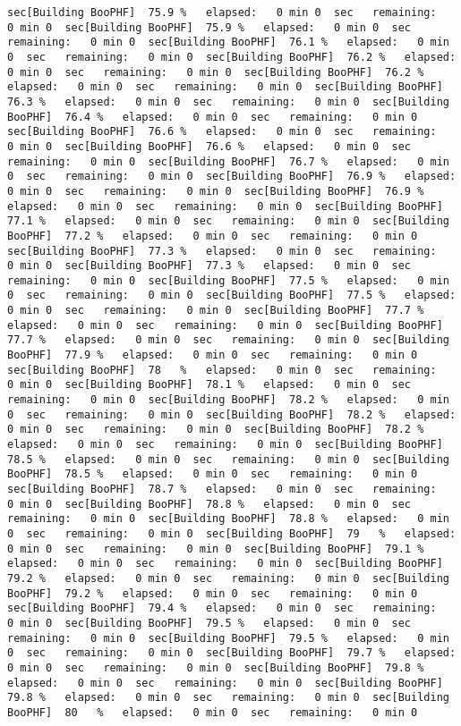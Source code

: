 \documentclass[
]{book}
\begin{document}
\begin{verbatim}
sec[Building BooPHF]  75.9 %   elapsed:   0 min 0  sec   remaining:   0 min 0  sec[Building BooPHF]  75.9 %   elapsed:   0 min 0  sec   remaining:   0 min 0  sec[Building BooPHF]  76.1 %   elapsed:   0 min 0  sec   remaining:   0 min 0  sec[Building BooPHF]  76.2 %   elapsed:   0 min 0  sec   remaining:   0 min 0  sec[Building BooPHF]  76.2 %   elapsed:   0 min 0  sec   remaining:   0 min 0  sec[Building BooPHF]  76.3 %   elapsed:   0 min 0  sec   remaining:   0 min 0  sec[Building BooPHF]  76.4 %   elapsed:   0 min 0  sec   remaining:   0 min 0  sec[Building BooPHF]  76.6 %   elapsed:   0 min 0  sec   remaining:   0 min 0  sec[Building BooPHF]  76.6 %   elapsed:   0 min 0  sec   remaining:   0 min 0  sec[Building BooPHF]  76.7 %   elapsed:   0 min 0  sec   remaining:   0 min 0  sec[Building BooPHF]  76.9 %   elapsed:   0 min 0  sec   remaining:   0 min 0  sec[Building BooPHF]  76.9 %   elapsed:   0 min 0  sec   remaining:   0 min 0  sec[Building BooPHF]  77.1 %   elapsed:   0 min 0  sec   remaining:   0 min 0  sec[Building BooPHF]  77.2 %   elapsed:   0 min 0  sec   remaining:   0 min 0  sec[Building BooPHF]  77.3 %   elapsed:   0 min 0  sec   remaining:   0 min 0  sec[Building BooPHF]  77.3 %   elapsed:   0 min 0  sec   remaining:   0 min 0  sec[Building BooPHF]  77.5 %   elapsed:   0 min 0  sec   remaining:   0 min 0  sec[Building BooPHF]  77.5 %   elapsed:   0 min 0  sec   remaining:   0 min 0  sec[Building BooPHF]  77.7 %   elapsed:   0 min 0  sec   remaining:   0 min 0  sec[Building BooPHF]  77.7 %   elapsed:   0 min 0  sec   remaining:   0 min 0  sec[Building BooPHF]  77.9 %   elapsed:   0 min 0  sec   remaining:   0 min 0  sec[Building BooPHF]  78   %   elapsed:   0 min 0  sec   remaining:   0 min 0  sec[Building BooPHF]  78.1 %   elapsed:   0 min 0  sec   remaining:   0 min 0  sec[Building BooPHF]  78.2 %   elapsed:   0 min 0  sec   remaining:   0 min 0  sec[Building BooPHF]  78.2 %   elapsed:   0 min 0  sec   remaining:   0 min 0  sec[Building BooPHF]  78.2 %   elapsed:   0 min 0  sec   remaining:   0 min 0  sec[Building BooPHF]  78.5 %   elapsed:   0 min 0  sec   remaining:   0 min 0  sec[Building BooPHF]  78.5 %   elapsed:   0 min 0  sec   remaining:   0 min 0  sec[Building BooPHF]  78.7 %   elapsed:   0 min 0  sec   remaining:   0 min 0  sec[Building BooPHF]  78.8 %   elapsed:   0 min 0  sec   remaining:   0 min 0  sec[Building BooPHF]  78.8 %   elapsed:   0 min 0  sec   remaining:   0 min 0  sec[Building BooPHF]  79   %   elapsed:   0 min 0  sec   remaining:   0 min 0  sec[Building BooPHF]  79.1 %   elapsed:   0 min 0  sec   remaining:   0 min 0  sec[Building BooPHF]  79.2 %   elapsed:   0 min 0  sec   remaining:   0 min 0  sec[Building BooPHF]  79.2 %   elapsed:   0 min 0  sec   remaining:   0 min 0  sec[Building BooPHF]  79.4 %   elapsed:   0 min 0  sec   remaining:   0 min 0  sec[Building BooPHF]  79.5 %   elapsed:   0 min 0  sec   remaining:   0 min 0  sec[Building BooPHF]  79.5 %   elapsed:   0 min 0  sec   remaining:   0 min 0  sec[Building BooPHF]  79.7 %   elapsed:   0 min 0  sec   remaining:   0 min 0  sec[Building BooPHF]  79.8 %   elapsed:   0 min 0  sec   remaining:   0 min 0  sec[Building BooPHF]  79.8 %   elapsed:   0 min 0  sec   remaining:   0 min 0  sec[Building BooPHF]  80   %   elapsed:   0 min 0  sec   remaining:   0 min 0  
\end{verbatim}
\end{document}
